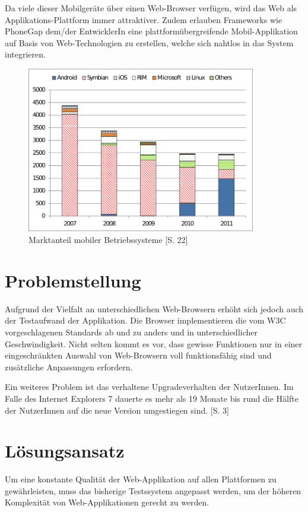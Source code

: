 \documentclass[a4paper,bibtotoc,oneside]{scrbook}
\begin{document}
Da viele dieser Mobilgeräte über einen Web-Browser verfügen, wird das Web als Applikations-Plattform immer attraktiver. Zudem erlauben Frameworks wie PhoneGap \cite{phonegap} dem/der EntwicklerIn eine plattformübergreifende Mobil-Applikation auf Basis von Web-Technologien zu erstellen, welche sich nahtlos in das System integrieren. 

\begin{figure}[h!]
\centering
\includegraphics[width=100mm]{img/operatingsystems.png}
\caption[Marktanteil mobiler Betriebssysteme]{Marktanteil mobiler Betriebssysteme \cite{smartphone}[S. 22]}\label{Abb2}
\end{figure}


\section{Problemstellung}
Aufgrund der Vielfalt an unterschiedlichen Web-Browsern erhöht sich jedoch auch der Testaufwand der Applikation. Die Browser implementieren die vom W3C vorgeschlagenen Standards ab und zu anders und in unterschiedlicher Geschwindigkeit. Nicht selten kommt es vor, dass gewisse Funktionen nur in einer eingeschränkten Auswahl von Web-Browsern voll funktionsfähig sind und zusätzliche Anpassungen erfordern. \cite{caniuse}

Ein weiteres Problem ist das verhaltene Upgradeverhalten der NutzerInnen. Im Falle des Internet Explorers 7 dauerte es mehr als 19 Monate bis rund die Hälfte der NutzerInnen auf die neue Version umgestiegen sind. \cite{insecure}[S. 3]


\section{Lösungsansatz}
Um eine konstante Qualität der Web-Applikation auf allen Plattformen zu gewährleisten, muss das bisherige Testssystem angepasst werden, um der höheren Komplexität von Web-Applikationen gerecht zu werden. 
\end{document}
